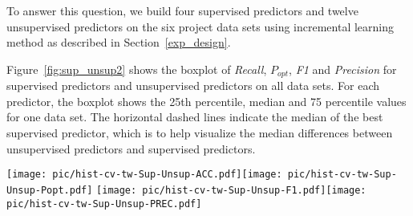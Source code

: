 \documentclass[sigconf]{acmart}
\theoremstyle{break}
\newcommand{\fig}[1]{Figure~\ref{fig:#1}}
\begin{document}
To answer this question, we build four supervised predictors and twelve
unsupervised predictors on the six project data sets using incremental learning
method as described in Section~\ref{exp_design}. 


 \fig{sup_unsup2} shows the boxplot of {\it Recall}, {\it $P_{opt}$}, {\it F1} and {\it Precision} for
supervised predictors and unsupervised predictors on all data sets. For each predictor, the boxplot shows the
25th percentile, median and 75 percentile  values for one data set. The horizontal dashed lines indicate
the median of the best supervised predictor, which is to help visualize the median differences between unsupervised
predictors and supervised predictors.  



\begin{figure*}[!htbp]
\begin{center}
    \texttt{[image: pic/hist-cv-tw-Sup-Unsup-ACC.pdf]}\texttt{[image: pic/hist-cv-tw-Sup-Unsup-Popt.pdf]}
    \texttt{[image: pic/hist-cv-tw-Sup-Unsup-F1.pdf]}\texttt{[image: pic/hist-cv-tw-Sup-Unsup-PREC.pdf]}
\caption{Performance comparisons between 
supervised and  unsupervised predictors over six projects~(from top to bottom are  Bugzilla, Platform, Mozilla, JDT, Columba, PostgreSQL). } 
\label{fig:sup_unsup2}
\end{center}
\end{figure*}
\end{document}
